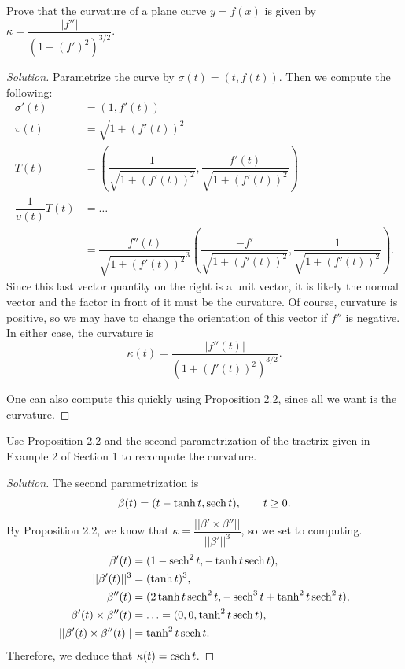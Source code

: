 \documentclass[Shifrin_Solutions_Spring_2015]{subfiles}
\begin{document}


\begin{exercise}
Prove that the curvature of a plane curve $y=f(x)$ is given by $\displaystyle \kappa = \dfrac{|f''|}{(1+(f')^2)^{3/2}}$.
\end{exercise}

\begin{proof}[Solution]
Parametrize the curve by $\sigma(t) = ( t, f(t) )$. Then we compute the following:
\begin{align*}
\sigma'(t) & = (1, f'(t) ) \\
\upsilon(t) & = \sqrt{1 + (f'(t))^2} \\
T(t) & = \left( \dfrac{1}{\sqrt{1 + (f'(t))^2} } , \dfrac{f'(t)}{\sqrt{1 + (f'(t))^2}} \right) \\
\dfrac{1}{\upsilon(t)} T(t) & = \ldots \\
& = \dfrac{f''(t)}{\sqrt{1 + (f'(t))^2}^3} \left( \dfrac{- f'}{\sqrt{1 + (f'(t))^2}} , \dfrac{1}{\sqrt{1 + (f'(t))^2}} \right) .
\end{align*}
Since this last vector quantity on the right is a unit vector, it is likely the normal vector and the factor in front of it must be the curvature. Of course, curvature is positive, so we may have to change the orientation of this vector if $f''$ is negative. In either case, the curvature is
\[
\kappa(t) = \dfrac{|f''(t)|}{(1 + (f'(t))^2)^{3/2}}  .
\]

One can also compute this quickly using Proposition 2.2, since all we want is the curvature.
\end{proof}




\begin{exercise}
Use Proposition 2.2 and the second parametrization of the tractrix given in Example 2 of Section 1 to recompute the curvature.
\end{exercise}

\begin{proof}[Solution]
The second parametrization is
\[
\beta(t) = (t-\tanh t , \operatorname{\mathrm{sech}} t ), \qquad t\geq 0.
\]
By Proposition 2.2, we know that $\kappa = \dfrac{||\beta' \times \beta''||}{||\beta'||^3}$, so we set to computing.
\begin{align*}
\beta'(t) & = ( 1 - \operatorname{\mathrm{sech}}^2 t , -\tanh t \operatorname{\mathrm{sech}} t ) , \\
||\beta'(t) ||^3 & = (\tanh t)^3 , \\
\beta''(t) & = ( 2\tanh t \operatorname{\mathrm{sech}}^2 t , -\operatorname{\mathrm{sech}}^3 t + \tanh^2 t \operatorname{\mathrm{sech}}^2 t ) , \\
\beta'(t) \times \beta''(t) &= \ldots = (0,0, \tanh^2 t \operatorname{\mathrm{sech}} t ) , \\
||\beta'(t) \times \beta''(t)|| & = \tanh^2 t \operatorname{\mathrm{sech}} t .
\end{align*}
Therefore, we deduce that $\kappa(t) = \operatorname{\mathrm{csch}} t$.
\end{proof}
\end{document}
